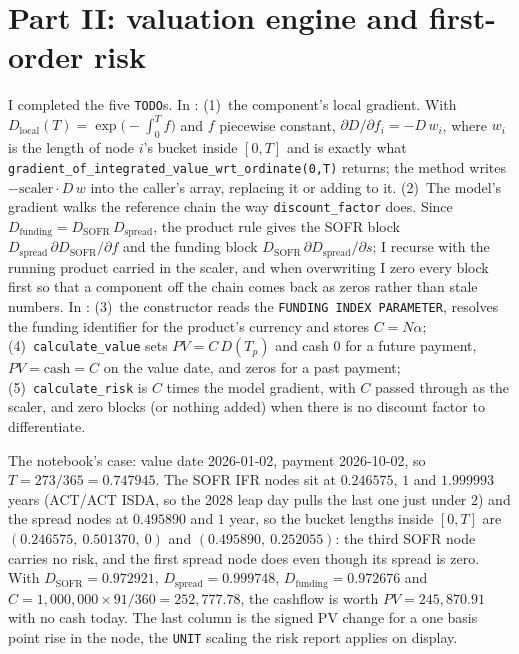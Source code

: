 \documentclass[10pt]{article}
\newcommand{\code}[1]{\texttt{#1}}
\begin{document}
\section*{Part II: valuation engine and first-order risk}
I completed the five \code{TODO}s. In : (1)~the component's local gradient. With
$D_{\mathrm{local}}(T)=\exp\bigl(-\int_0^T f\bigr)$ and $f$ piecewise constant, $\partial D/\partial f_i=-D\,w_i$, where $w_i$ is the
length of node $i$'s bucket inside $[0,T]$ and is exactly what \code{gradient\_of\_integrated\_value\_wrt\_ordinate(0,T)} returns; the
method writes $-\mathrm{scaler}\cdot D\,w$ into the caller's array, replacing it or adding to it. (2)~The model's gradient walks the
reference chain the way \code{discount\_factor} does. Since $D_{\mathrm{funding}}=D_{\mathrm{SOFR}}\,D_{\mathrm{spread}}$, the product rule
gives the SOFR block $D_{\mathrm{spread}}\,\partial D_{\mathrm{SOFR}}/\partial f$ and the funding block
$D_{\mathrm{SOFR}}\,\partial D_{\mathrm{spread}}/\partial s$; I recurse with the running product carried in the scaler, and when overwriting
I zero every block first so that a component off the chain comes back as zeros rather than stale numbers. In
: (3)~the constructor reads the \code{FUNDING INDEX PARAMETER}, resolves the
funding identifier for the product's currency and stores $C=N\alpha$; (4)~\code{calculate\_value} sets $PV=C\,D(T_p)$ and cash $0$ for a
future payment, $PV=\mathrm{cash}=C$ on the value date, and zeros for a past payment; (5)~\code{calculate\_risk} is $C$ times the model
gradient, with $C$ passed through as the scaler, and zero blocks (or nothing added) when there is no discount factor to differentiate.

The notebook's case: value date 2026-01-02, payment 2026-10-02, so $T=273/365=0.747945$.
The SOFR IFR nodes sit at $0.246575$, $1$ and $1.999993$ years (ACT/ACT ISDA, so the 2028 leap day pulls the last one just under $2$) and the spread nodes at $0.495890$ and $1$ year, so the bucket lengths inside
$[0,T]$ are $(0.246575,\ 0.501370,\ 0)$ and $(0.495890,\ 0.252055)$: the third SOFR node carries no risk, and the first spread node does
even though its spread is zero. With $D_{\mathrm{SOFR}}=0.972921$, $D_{\mathrm{spread}}=0.999748$,
$D_{\mathrm{funding}}=0.972676$ and $C=1{,}000{,}000\times91/360=252,777.78$, the cashflow is worth
$PV=245,870.91$ with no cash today. The last column is the signed PV change for a one basis point rise in the node, the
\code{UNIT} scaling the risk report applies on display.
\end{document}
